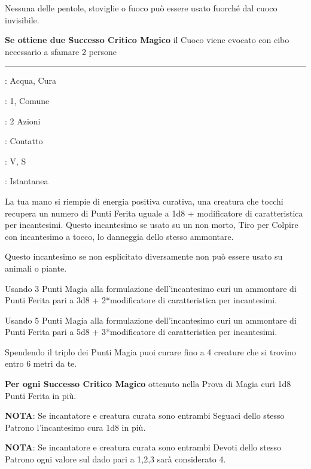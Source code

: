 \begin{multicols}{2}
Nessuna delle pentole, stoviglie o fuoco può essere usato fuorché dal cuoco invisibile.

\textbf{Se ottiene due Successo Critico Magico} il Cuoco viene evocato con cibo necessario a sfamare 2 persone

\smallskip\noindent\rule{\linewidth}{2pt} \hypertarget{Cura Ferite}{}\medskip{}
\noindent
\begin{description}[noitemsep, topsep=0pt, parsep=0pt, partopsep=0pt, leftmargin=0cm, labelwidth=2.8cm]
	\item[\textbf{Lista di Magia}]: Acqua, Cura
	\item[\textbf{Livello}]: 1, Comune
	\item[\textbf{T. di Lancio}]: 2 Azioni
	\item[\textbf{Gittata}]: Contatto
	\item[\textbf{Componenti}]: V, S
	\item[\textbf{Durata}]: Istantanea
\end{description}

La tua mano si riempie di energia positiva curativa, una creatura che tocchi recupera un numero di Punti Ferita uguale a 1d8 + modificatore di caratteristica per incantesimi. Questo incantesimo se usato su un non morto, Tiro per Colpire con incantesimo a tocco, lo danneggia dello stesso ammontare.

Questo incantesimo se non esplicitato diversamente non può essere usato su animali o piante.

Usando 3 Punti Magia alla formulazione dell'incantesimo curi un ammontare di Punti Ferita pari a 3d8 + 2*modificatore di caratteristica per incantesimi.

Usando 5 Punti Magia alla formulazione dell'incantesimo curi un ammontare di Punti Ferita pari a 5d8 + 3*modificatore di caratteristica per incantesimi.

Spendendo il triplo dei Punti Magia puoi curare fino a 4 creature che si trovino entro 6 metri da te.

\textbf{Per ogni Successo Critico Magico} ottenuto nella Prova di Magia curi 1d8 Punti Ferita in più.

\textbf{NOTA}: Se incantatore e creatura curata sono entrambi Seguaci dello stesso Patrono l'incantesimo cura 1d8 in più.

\textbf{NOTA}: Se incantatore e creatura curata sono entrambi Devoti dello stesso Patrono ogni valore sul dado pari a 1,2,3 sarà considerato 4.


\end{multicols}
